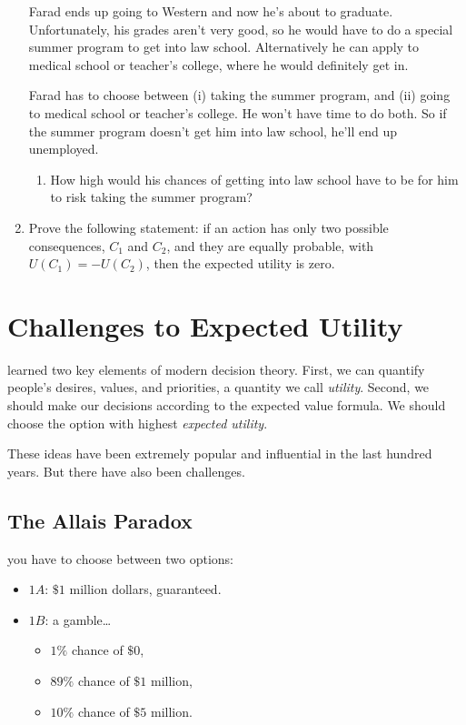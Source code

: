 \documentclass[justified]{tufte-book}
\providecommand{\tightlist}{%
  \setlength{\itemsep}{0pt}\setlength{\parskip}{0pt}}
\renewcommand{\u}{U}
\theoremstyle{definition}
\theoremstyle{definition}
\theoremstyle{definition}
\theoremstyle{remark}
\begin{document}
\begin{enumerate}
  Farad ends up going to Western and now he's about to graduate.
  Unfortunately, his grades aren't very good, so he would have to do a
  special summer program to get into law school. Alternatively he can
  apply to medical school or teacher's college, where he would
  definitely get in.

  Farad has to choose between (i) taking the summer program, and (ii)
  going to medical school or teacher's college. He won't have time to do
  both. So if the summer program doesn't get him into law school, he'll
  end up unemployed.

  \begin{enumerate}
  \def\labelenumii{\alph{enumii}.}
  \setcounter{enumii}{2}
  \tightlist
  \item
    How high would his chances of getting into law school have to be for
    him to risk taking the summer program?
  \end{enumerate}
\item
  Prove the following statement: if an action has only two possible
  consequences, \(C_1\) and \(C_2\), and they are equally probable, with
  \(\u(C_1) = -\u(C_2)\), then the expected utility is zero.
\end{enumerate}

\hypertarget{challenges-to-expected-utility}{%
\chapter{Challenges to Expected
Utility}\label{challenges-to-expected-utility}}

 learned two key elements of modern decision theory.
First, we can quantify people's desires, values, and priorities, a
quantity we call \emph{utility}. Second, we should make our decisions
according to the expected value formula. We should choose the option
with highest \emph{expected utility}.

These ideas have been extremely popular and influential in the last
hundred years. But there have also been challenges.

\hypertarget{the-allais-paradox}{%
\section{The Allais Paradox}\label{the-allais-paradox}}

 you have to choose between two options:

\begin{itemize}
\tightlist
\item
  \(1A\): \(\$1\) million dollars, guaranteed.
\item
  \(1B\): a gamble\ldots{}

  \begin{itemize}
  \tightlist
  \item
    \(1\%\) chance of \(\$0\),
  \item
    \(89\%\) chance of \(\$1\) million,
  \item
    \(10\%\) chance of \(\$5\) million.
  \end{itemize}
\end{itemize}
\end{document}
